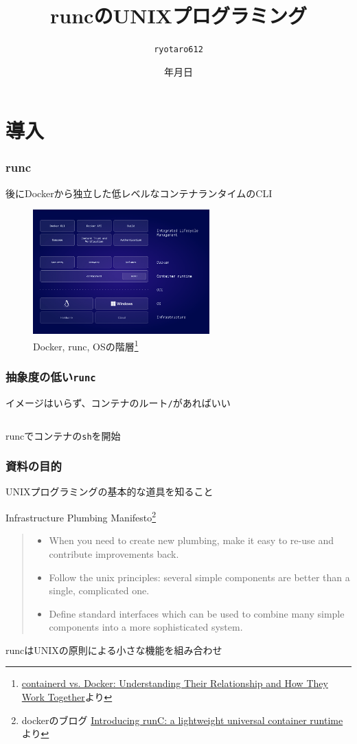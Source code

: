 \documentclass[unicode, 14pt, aspectratio=169]{beamer}
\date{\number\year 年\number\month 月\number\day 日}
\title{runcのUNIXプログラミング}
\author{\texttt{ryotaro612}}
\begin{document}
\begin{frame}
\titlepage
\end{frame}
\section{導入}
\begin{frame}
  \frametitle{runc}
  後にDockerから独立した低レベルなコンテナランタイムのCLI
  \begin{figure}
    \centering
    \includegraphics[width=6.8cm]{images/containerd-diagram-v1.png}
    \caption{Docker, runc, OSの階層\footnote{\scriptsize{\href{https://www.docker.com/blog/containerd-vs-docker}{containerd vs. Docker: Understanding Their Relationship and How They Work Together}より}}}
    \label{fig:runc}
  \end{figure}
\end{frame}
\begin{frame}%
  \frametitle{抽象度の低い\texttt{runc}}
  イメージはいらず、コンテナのルート\texttt{/}があればいい
  \begin{center}
    \inputminted[fontsize=\small]{sh}{code/run.sh}
    runcでコンテナの\texttt{sh}を開始\supercite{runc}  
  \end{center}
\end{frame}
\begin{frame}
  \frametitle{資料の目的}
  UNIXプログラミングの基本的な道具を知ること
  \begin{center}
    Infrastructure Plumbing Manifesto\footnote{\scriptsize{dockerのブログ \href{https://www.docker.com/blog/runc/}{Introducing runC: a lightweight universal container runtime
}より}}
    \end{center}
  \begin{quote}
    \begin{itemize}
    \item {\small When you need to create new plumbing, make it easy to re-use and contribute improvements back.}
    \item {\small Follow the unix principles: several simple components are better than a single, complicated one.}
    \item {\small Define standard interfaces which can be used to combine many simple components into a more sophisticated system.}
  \end{itemize}
\end{quote}
  runcはUNIXの原則による小さな機能を組み合わせ
\end{frame}
\end{document}
